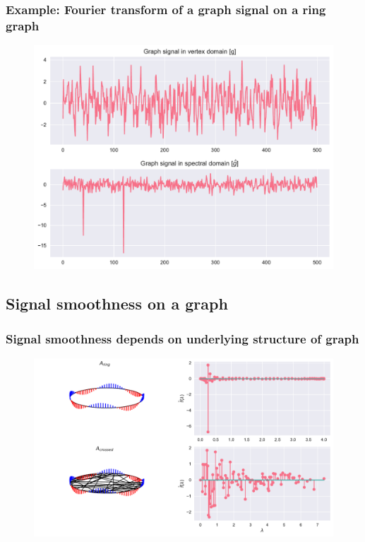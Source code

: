 \documentclass{beamer}
\begin{document}
\begin{frame}
  \frametitle{Example: Fourier transform of a graph signal on a ring graph}
\begin{figure}
\includegraphics[width=0.7\linewidth]{../img/graph_fourier_transform_2.pdf}
\end{figure}
\end{frame}

\subsection{Signal smoothness on a graph}

\begin{frame}
  \frametitle{Signal smoothness depends on underlying structure of graph}
\begin{figure}
\includegraphics[width=0.9\linewidth]{../img/signal_smoothness_0.pdf}
\end{figure}
\end{frame}
\end{document}
